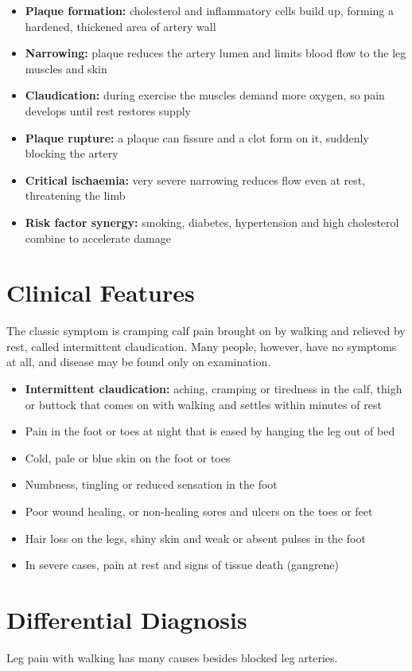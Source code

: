\begin{itemize}
    \item \textbf{Plaque formation:} cholesterol and inflammatory cells build up, forming a hardened, thickened area of artery wall
    \item \textbf{Narrowing:} plaque reduces the artery lumen and limits blood flow to the leg muscles and skin
    \item \textbf{Claudication:} during exercise the muscles demand more oxygen, so pain develops until rest restores supply
    \item \textbf{Plaque rupture:} a plaque can fissure and a clot form on it, suddenly blocking the artery
    \item \textbf{Critical ischaemia:} very severe narrowing reduces flow even at rest, threatening the limb
    \item \textbf{Risk factor synergy:} smoking, diabetes, hypertension and high cholesterol combine to accelerate damage
\end{itemize}

\section*{Clinical Features}
The classic symptom is cramping calf pain brought on by walking and relieved by rest, called intermittent claudication. Many people, however, have no symptoms at all, and disease may be found only on examination.

\begin{itemize}
    \item \textbf{Intermittent claudication:} aching, cramping or tiredness in the calf, thigh or buttock that comes on with walking and settles within minutes of rest
    \item Pain in the foot or toes at night that is eased by hanging the leg out of bed
    \item Cold, pale or blue skin on the foot or toes
    \item Numbness, tingling or reduced sensation in the foot
    \item Poor wound healing, or non-healing sores and ulcers on the toes or feet
    \item Hair loss on the legs, shiny skin and weak or absent pulses in the foot
    \item In severe cases, pain at rest and signs of tissue death (gangrene)
\end{itemize}

\section*{Differential Diagnosis}
Leg pain with walking has many causes besides blocked leg arteries.

